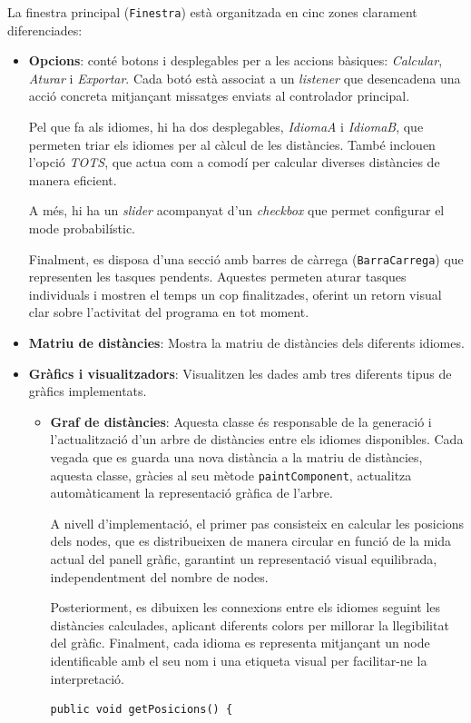 \documentclass{ieeetj}
\begin{document}
La finestra principal (\texttt{Finestra}) està organitzada en cinc zones clarament diferenciades:
\begin{itemize}
   \item \textbf{Opcions}: conté botons i desplegables per a les accions bàsiques: \emph{Calcular}, \emph{Aturar} i \emph{Exportar}. Cada botó està associat a un \emph{listener} que desencadena una acció concreta mitjançant missatges enviats al controlador principal.\newline

Pel que fa als idiomes, hi ha dos desplegables, \emph{IdiomaA} i \emph{IdiomaB}, que permeten triar els idiomes per al càlcul de les distàncies. També inclouen l’opció \emph{TOTS}, que actua com a comodí per calcular diverses distàncies de manera eficient.

A més, hi ha un \emph{slider} acompanyat d’un \emph{checkbox} que permet configurar el mode probabilístic.\newline

Finalment, es disposa d’una secció amb barres de càrrega (\texttt{BarraCarrega}) que representen les tasques pendents. Aquestes permeten aturar tasques individuals i mostren el temps un cop finalitzades, oferint un retorn visual clar sobre l’activitat del programa en tot moment.\newline

    
    \item \textbf{Matriu de distàncies}: Mostra la matriu de distàncies dels diferents idiomes.
    \item \textbf{Gràfics i visualitzadors}: Visualitzen les dades amb tres diferents tipus de gràfics implementats.
    \begin{itemize}
       \item \textbf{Graf de distàncies}: Aquesta classe és responsable de la generació i l'actualització d'un arbre de distàncies entre els idiomes disponibles. Cada vegada que es guarda una nova distància a la matriu de distàncies, aquesta classe, gràcies al seu mètode \texttt{paintComponent}, actualitza automàticament la representació gràfica de l'arbre.\newline


A nivell d'implementació, el primer pas consisteix en calcular les posicions dels nodes, que es distribueixen de manera circular en funció de la mida actual del panell gràfic, garantint un representació visual equilibrada, independentment del nombre de nodes. 

Posteriorment, es dibuixen les connexions entre els idiomes seguint les distàncies calculades, aplicant diferents colors per millorar la llegibilitat del gràfic. Finalment, cada idioma es representa mitjançant un node identificable amb el seu nom i una etiqueta visual per facilitar-ne la interpretació.
\begin{lstlisting}
public void getPosicions() {


\end{lstlisting}
\end{itemize}
\end{itemize}
\end{document}
